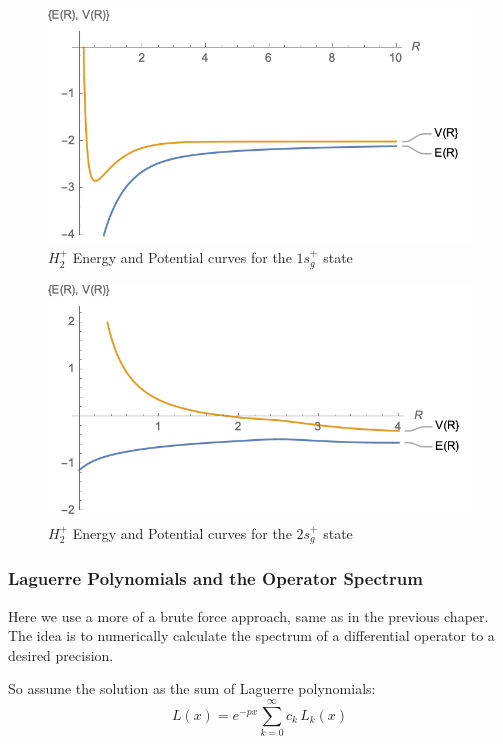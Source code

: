 \begin{figure}
  \includegraphics{H2_1Sg-Potential.png}
  \caption{$ H_2^{+} $ Energy and Potential curves for the $ 1s_g^{+} $ state}
\end{figure}

\begin{figure}
  \includegraphics{H2_2Sg-Potential.png}
  \caption{$ H_2^{+} $ Energy and Potential curves for the $ 2s_g^{+} $ state}
\end{figure}


\subsubsection{Laguerre Polynomials and the Operator Spectrum}

Here we use a more of a brute force approach, same as in the previous chaper. The idea is to numerically calculate the spectrum of a differential operator to a desired precision.

So assume the solution as the sum of Laguerre polynomials:
\begin{equation}
L(x) =  e^{-px}\sum_{k=0}^{\infty}{c_k\,L_k(x)}\label{L2-3}
\end{equation}


